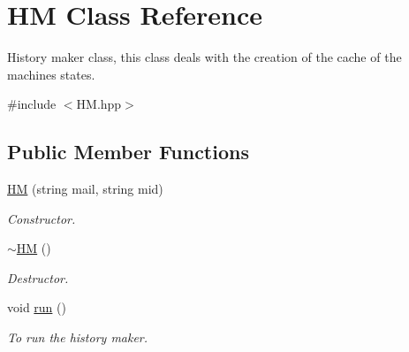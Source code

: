 \hypertarget{classHM}{
\section{HM Class Reference}
\label{classHM}
}


History maker class, this class deals with the creation of the cache of the machines states.  




{\ttfamily \#include $<$HM.hpp$>$}

\subsection*{Public Member Functions}
\begin{DoxyCompactItemize}
\item 
\hyperlink{classHM_a33f6adf64ee9c2fc125f9272f485d009}{HM} (string mail, string mid)
\begin{DoxyCompactList}\small\item\em Constructor. \item\end{DoxyCompactList}\item 
\hypertarget{classHM_a56ccf31ea2d69a79c18c1cb2e8ea5a67}{
\hyperlink{classHM_a56ccf31ea2d69a79c18c1cb2e8ea5a67}{$\sim$HM} ()}
\label{classHM_a56ccf31ea2d69a79c18c1cb2e8ea5a67}

\begin{DoxyCompactList}\small\item\em Destructor. \item\end{DoxyCompactList}\item 
\hypertarget{classHM_a120afa56949814e921371e83ef179d30}{
void \hyperlink{classHM_a120afa56949814e921371e83ef179d30}{run} ()}
\label{classHM_a120afa56949814e921371e83ef179d30}

\begin{DoxyCompactList}\small\item\em To run the history maker. \item\end{DoxyCompactList}\end{DoxyCompactItemize}
